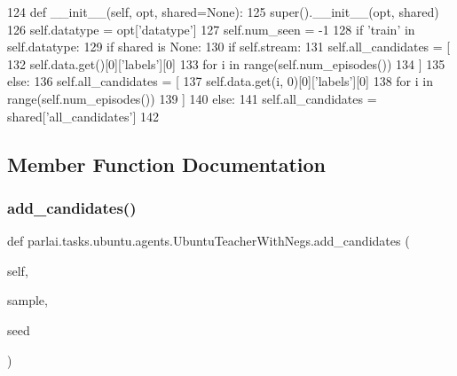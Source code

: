 \begin{DoxyCode}
124     \textcolor{keyword}{def }\_\_init\_\_(self, opt, shared=None):
125         super().\_\_init\_\_(opt, shared)
126         self.datatype = opt[\textcolor{stringliteral}{'datatype'}]
127         self.num\_seen = -1
128         \textcolor{keywordflow}{if} \textcolor{stringliteral}{'train'} \textcolor{keywordflow}{in} self.datatype:
129             \textcolor{keywordflow}{if} shared \textcolor{keywordflow}{is} \textcolor{keywordtype}{None}:
130                 \textcolor{keywordflow}{if} self.stream:
131                     self.all\_candidates = [
132                         self.data.get()[0][\textcolor{stringliteral}{'labels'}][0]
133                         \textcolor{keywordflow}{for} i \textcolor{keywordflow}{in} range(self.num\_episodes())
134                     ]
135                 \textcolor{keywordflow}{else}:
136                     self.all\_candidates = [
137                         self.data.get(i, 0)[0][\textcolor{stringliteral}{'labels'}][0]
138                         \textcolor{keywordflow}{for} i \textcolor{keywordflow}{in} range(self.num\_episodes())
139                     ]
140             \textcolor{keywordflow}{else}:
141                 self.all\_candidates = shared[\textcolor{stringliteral}{'all\_candidates'}]
142 
\end{DoxyCode}


\subsection{Member Function Documentation}
\mbox{\label{classparlai_1_1tasks_1_1ubuntu_1_1agents_1_1UbuntuTeacherWithNegs_aca16cfaf6d38cfc93ace8445811863c3}} 
\subsubsection{\texorpdfstring{add\+\_\+candidates()}{add\_candidates()}}
{\footnotesize\ttfamily def parlai.\+tasks.\+ubuntu.\+agents.\+Ubuntu\+Teacher\+With\+Negs.\+add\+\_\+candidates (\begin{DoxyParamCaption}\item[{}]{self,  }\item[{}]{sample,  }\item[{}]{seed }\end{DoxyParamCaption})}

